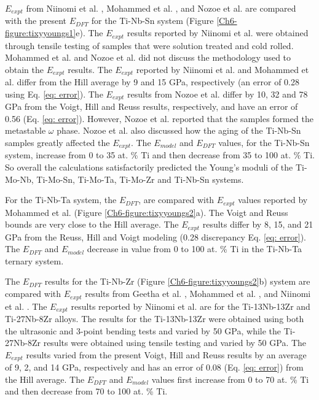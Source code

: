 $E_{expt}$ from Niinomi et al. \cite{Niinomi2012}, Mohammed et al. \cite{Mohammed2014}, and Nozoe et al. \cite{Nozoe2007} are compared with the present $E_{DFT}$ for the Ti-Nb-Sn system (Figure \ref{Ch6-figure:tixyyoungs1}e). The $E_{expt}$ results reported by Niinomi et al. \cite{Niinomi2012} were obtained through tensile testing of samples that were solution treated and cold rolled. Mohammed et al. \cite{Mohammed2014} and Nozoe et al. \cite{Nozoe2007} did not discuss the methodology used to obtain the $E_{expt}$ results. The $E_{expt}$ reported by Niinomi et al. \cite{Niinomi2012} and Mohammed et al. \cite{Mohammed2014} differ from the Hill average by 9 and 15 GPa, respectively (an error of 0.28 using Eq. \ref{eq: error}). The $E_{expt}$ results from Nozoe et al. \cite{Nozoe2007} differ by 10, 32 and 78 GPa from the Voigt, Hill and Reuss results, respectively, and have an error of 0.56 (Eq. \ref{eq: error}). However, Nozoe et al. reported that the samples formed the metastable $\omega$ phase. Nozoe et al. \cite{Nozoe2007} also discussed how the aging of the Ti-Nb-Sn samples greatly affected the $E_{expt}$. The $E_{model}$ and $E_{DFT}$ values, for the Ti-Nb-Sn system, increase from 0 to 35 at. \% Ti and then decrease from 35 to 100 at. \% Ti. So overall the calculations satisfactorily predicted the Young's moduli of the Ti-Mo-Nb, Ti-Mo-Sn, Ti-Mo-Ta, Ti-Mo-Zr and Ti-Nb-Sn systems. 

For the Ti-Nb-Ta system, the $E_{DFT}$, are compared with $E_{expt}$ values reported by Mohammed et al. \cite{Mohammed2014} (Figure \ref{Ch6-figure:tixyyoungs2}a). The Voigt and Reuss bounds are very close to the Hill average. The $E_{expt}$ results differ by 8, 15, and 21 GPa from the Reuss, Hill and Voigt modeling (0.28 discrepancy Eq. \ref{eq: error}). The $E_{DFT}$ and $E_{model}$ decrease in value from 0 to 100 at. \% Ti in the Ti-Nb-Ta ternary system. 

The $E_{DFT}$ results for the Ti-Nb-Zr (Figure \ref{Ch6-figure:tixyyoungs2}b) system are compared with $E_{expt}$ results from Geetha et al. \cite{Geetha2009},  Mohammed et al. \cite{Mohammed2014}, and Niinomi et al. \cite{Niinomi2012}. The $E_{expt}$ results reported by Niinomi et al. \cite{Niinomi2012} are for the Ti-13Nb-13Zr and Ti-27Nb-8Zr alloys. The results for the Ti-13Nb-13Zr were obtained using both the ultrasonic and 3-point bending tests and varied by 50 GPa, while the Ti-27Nb-8Zr results were obtained using tensile testing and varied by 50 GPa. The $E_{expt}$ results varied from the present Voigt, Hill and Reuss results by an average of 9, 2, and 14 GPa, respectively and has an error of 0.08 (Eq. \ref{eq: error}) from the Hill average. The $E_{DFT}$ and $E_{model}$ values first increase from 0 to 70 at. \% Ti and then decrease from 70 to 100 at. \% Ti.

